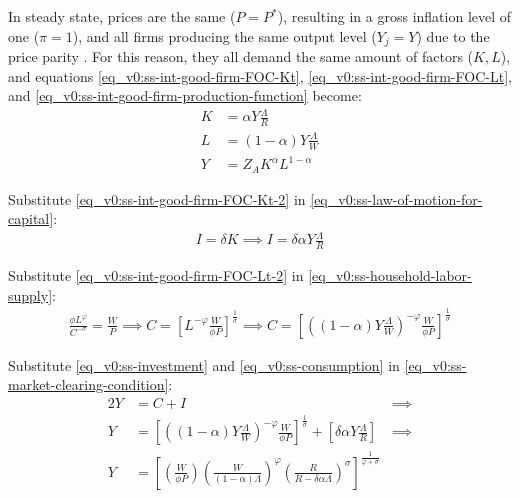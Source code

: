 \documentclass[../thesis.tex]{subfiles}
\begin{document}
	In steady state, prices are the same ($P = P^\ast$), resulting in a gross inflation level of one ($\pi=1$), and all firms producing the same output level ($Y_j=Y$) due to the price parity \cite[Lecture 13, p.12]{solis-garcia_ucb_2022}. For this reason, they all demand the same amount of factors ($K,L$), and equations \ref{eq_v0:ss-int-good-firm-FOC-Kt}, \ref{eq_v0:ss-int-good-firm-FOC-Lt}, and \ref{eq_v0:ss-int-good-firm-production-function} become:
	\begin{align}
		K &= \alpha Y \frac{\Lambda}{R} \label{eq_v0:ss-int-good-firm-FOC-Kt-2} \\
		L &= (1-\alpha) Y \frac{\Lambda}{W} \label{eq_v0:ss-int-good-firm-FOC-Lt-2} \\
		Y &= Z_{A} K^\alpha L^{1-\alpha} \label{eq_v0:ss-int-good-firm-production-function-2}
	\end{align}
	
	Substitute \ref{eq_v0:ss-int-good-firm-FOC-Kt-2} in \ref{eq_v0:ss-law-of-motion-for-capital}:
	\begin{align}
		\label{eq_v0:ss-investment}
		I = \delta K \implies I = \delta \alpha Y \frac{\Lambda}{R}
	\end{align}
	
	Substitute \ref{eq_v0:ss-int-good-firm-FOC-Lt-2} in \ref{eq_v0:ss-household-labor-supply}:
	\begin{align}
		\label{eq_v0:ss-consumption}
		\frac{\phi L^{\varphi}}{C^{-\sigma}} = \frac{W}{P}
		\implies
		C = \left[ L^{-\varphi} \frac{W}{\phi P} \right]^{\frac{1}{\sigma}}
		\implies
		C = \left[ \left( (1-\alpha) Y \frac{\Lambda}{W} \right)^{-\varphi} \frac{W}{\phi P} \right]^{\frac{1}{\sigma}}
	\end{align}
	
	Substitute \ref{eq_v0:ss-investment} and \ref{eq_v0:ss-consumption} in \ref{eq_v0:ss-market-clearing-condition}:
	\begin{alignat}{2}
		Y &= C + I &\implies \nonumber \\
		Y &= \left[ \left( (1-\alpha) Y \frac{\Lambda}{W} \right)^{-\varphi} \frac{W}{\phi P} \right]^{\frac{1}{\sigma}} + \left[ \delta \alpha Y \frac{\Lambda}{R} \right] &\implies \nonumber \\
		Y &=\left[
		\left( \frac{W}{\phi P}                \right)
		\left( \frac{W}{(1-\alpha)\Lambda}     \right)^\varphi
		\left( \frac{R}{R-\delta\alpha\Lambda} \right)^\sigma
		\right]^\frac{1}{\varphi+\sigma} & \label{eq_v0:ss-production}
	\end{alignat}
	
\end{document}
